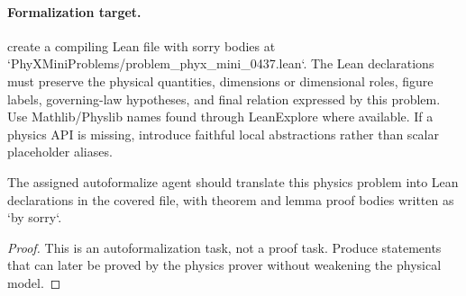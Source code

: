 \paragraph{Formalization target.}
create a compiling Lean file with sorry bodies at `PhyXMiniProblems/problem\_phyx\_mini\_0437.lean`. The Lean declarations must preserve the physical quantities, dimensions or dimensional roles, figure labels, governing-law hypotheses, and final relation expressed by this problem.
Use Mathlib/Physlib names found through LeanExplore where available. If a physics API is missing, introduce faithful local abstractions rather than scalar placeholder aliases.

\begin{theorem}
\label{thm:physics:phyx_mini_0437:target}
The assigned autoformalize agent should translate this physics problem into Lean declarations in the covered file, with theorem and lemma proof bodies written as `by sorry`.
\end{theorem}
\begin{proof}
This is an autoformalization task, not a proof task. Produce statements that can later be proved by the physics prover without weakening the physical model.
\end{proof}

